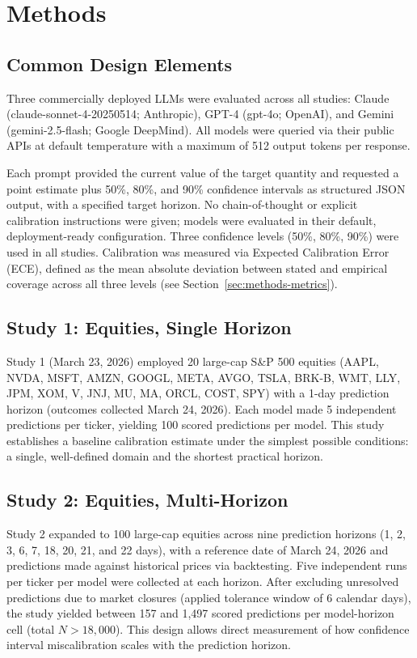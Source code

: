 \section{Methods}
\label{sec:methods}

\subsection{Common Design Elements}
\label{sec:methods-common}

Three commercially deployed LLMs were evaluated across all studies: Claude
(claude-sonnet-4-20250514; Anthropic), GPT-4 (gpt-4o; OpenAI), and Gemini
(gemini-2.5-flash; Google DeepMind). All models were queried via their public APIs
at default temperature with a maximum of 512 output tokens per response.

Each prompt provided the current value of the target quantity and requested a point
estimate plus 50\%, 80\%, and 90\% confidence intervals as structured JSON output,
with a specified target horizon. No chain-of-thought or explicit calibration
instructions were given; models were evaluated in their default,
deployment-ready configuration. Three confidence levels (50\%, 80\%, 90\%) were
used in all studies. Calibration was measured via Expected Calibration Error (ECE),
defined as the mean absolute deviation between stated and empirical coverage
across all three levels (see Section~\ref{sec:methods-metrics}).

\subsection{Study 1: Equities, Single Horizon}
\label{sec:methods-study1}

Study 1 (March 23, 2026) employed 20 large-cap S\&P 500 equities (AAPL, NVDA,
MSFT, AMZN, GOOGL, META, AVGO, TSLA, BRK-B, WMT, LLY, JPM, XOM, V, JNJ, MU,
MA, ORCL, COST, SPY) with a 1-day prediction horizon (outcomes collected March
24, 2026). Each model made 5 independent predictions per ticker, yielding 100
scored predictions per model. This study establishes a baseline calibration
estimate under the simplest possible conditions: a single, well-defined domain
and the shortest practical horizon.

\subsection{Study 2: Equities, Multi-Horizon}
\label{sec:methods-study2}

Study 2 expanded to 100 large-cap equities across nine prediction horizons (1,
2, 3, 6, 7, 18, 20, 21, and 22 days), with a reference date of March 24, 2026
and predictions made against historical prices via backtesting. Five independent
runs per ticker per model were collected at each horizon. After excluding
unresolved predictions due to market closures (applied tolerance window of 6
calendar days), the study yielded between 157 and 1,497 scored predictions per
model-horizon cell (total $N > 18{,}000$). This design allows direct measurement
of how confidence interval miscalibration scales with the prediction horizon.

